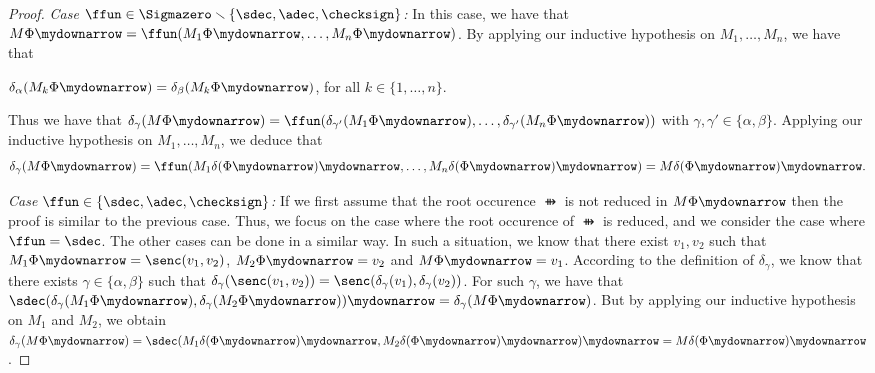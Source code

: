 \begin{proof}
\smallskip{}

\emph{Case $\ffun \in \Sigmazero \smallsetminus \{\sdec, \adec, \checksign\}$:} In
this case, we have that $M\Phi\mydownarrow = \ffun(M_1\Phi\mydownarrow,\allowbreak \ldots,
M_n\Phi\mydownarrow)$. By applying our inductive hypothesis on $M_1, \ldots,
M_n$, we have that 
\begin{center}
$\delta_\alpha(M_k\Phi\mydownarrow) =
\delta_\beta(M_k\Phi\mydownarrow)$, for all $k \in \{1, \ldots,
n\}$. 
\end{center}
Thus we
have that $\delta_\gamma(M\Phi\mydownarrow) =
\ffun(\delta_{\gamma'}(M_1\Phi\mydownarrow), \ldots,
\delta_{\gamma'}(M_n\Phi\mydownarrow))$ with $\gamma,
\gamma'\in\{\alpha, \beta\}$.
Applying our inductive hypothesis on $M_1, \ldots, M_n$, we
deduce that 
\[\delta_\gamma(M\Phi\mydownarrow) =
\ffun(M_1\delta(\Phi\mydownarrow)\mydownarrow, \ldots,
M_n\delta(\Phi\mydownarrow)\mydownarrow) = M\delta(\Phi\mydownarrow)\mydownarrow.
\]


\smallskip{}

\emph{Case $\ffun \in \{\sdec, \adec, \checksign\}$:} If we first assume that
the root occurence $\ffun$ is not reduced in $M\Phi\mydownarrow$ then the proof
is similar to the previous case. Thus, we focus on the case where the root
occurence of $\ffun$ is reduced, and we consider the case where $\ffun
= \sdec$. The other cases can be done in a similar way.
In such a situation, we know that there exist $v_1, v_2$ such that
$M_1\Phi\mydownarrow = \senc(v_1,v_2)$, $M_2\Phi\mydownarrow = v_2$ and
 $M\Phi\mydownarrow = v_1$. According to the definition of $\delta_\gamma$, we
 know that there exists $\gamma \in \{\alpha,\beta\}$ such that
 $\delta_{\gamma}(\senc(v_1,v_2)) = \senc(\delta_{\gamma}(v_1),
 \delta_{\gamma}(v_2))$. For such $\gamma$, we have that
 $\sdec(\delta_{\gamma}(M_1\Phi\mydownarrow),
 \delta_\gamma(M_2\Phi\mydownarrow))\mydownarrow =
 \delta_\gamma(M\Phi\mydownarrow)$. But by applying our inductive hypothesis on
 $M_1$ and $M_2$, we obtain $\delta_\gamma(M\Phi\mydownarrow) =
 \sdec(M_1\delta(\Phi\mydownarrow)\mydownarrow,
 M_2\delta(\Phi\mydownarrow)\mydownarrow)\mydownarrow =
 M\delta(\Phi\mydownarrow)\mydownarrow$.

\bigskip{}


\end{proof}
